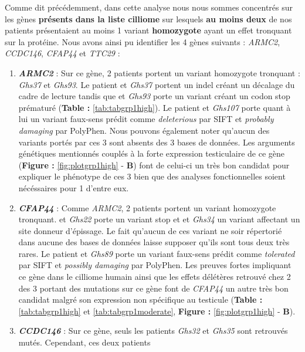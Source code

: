 \documentclass[12pt,twoside]{reedthesis}
\theoremstyle{definition}
\theoremstyle{definition}
\theoremstyle{remark}
\begin{document}
  Comme dit précédemment, dans cette analyse nous nous sommes concentrés
  sur les gènes \textbf{présents dans la liste cilliome} sur lesquels
  \textbf{au moins deux} de nos patients présentaient au moins 1 variant
  \textbf{homozygote} ayant un effet tronquant sur la protéine. Nous avons
  ainsi pu identifier les 4 gènes suivants : \emph{ARMC2}, \emph{CCDC146},
  \emph{CFAP44} et \emph{TTC29} :
  
  \begin{enumerate}
  \def\labelenumi{\arabic{enumi}.}
  \item
    \textbf{\emph{ARMC2}} : Sur ce gène, 2 patients portent un variant
    homozygote tronquant : \emph{Ghs37} et \emph{Ghs93}. Le patient et
    \emph{Ghs37} portent un indel créant un décalage du cadre de lecture
    tandis que et \emph{Ghs93} porte un variant créant un codon stop
    prématuré (\textbf{Table : }\ref{tab:tabgrp1high}). Le patient et
    \emph{Ghs107} porte quant à lui un variant faux-sens prédit comme
    \emph{deleterious} par SIFT et \emph{probably damaging} par PolyPhen.
    Nous pouvons également noter qu'aucun des variants portés par ces 3
    sont absents des 3 bases de données. Les arguments génétiques
    mentionnés couplés à la forte expression testiculaire de ce gène
    (\textbf{Figure : }\ref{fig:plotgrp1high} - \textbf{B}) font de
    celui-ci un très bon candidat pour expliquer le phénotype de ces 3
    bien que des analyses fonctionnelles soient nécéssaires pour 1 d'entre
    eux.
  \item
    \textbf{\emph{CFAP44}} : Comme \emph{ARMC2}, 2 patients portent un
    variant homozygote tronquant. et \emph{Ghs22} porte un variant stop et
    et \emph{Ghs34} un variant affectant un site donneur d'épissage. Le
    fait qu'aucun de ces variant ne soir répertorié dans aucune des bases
    de données laisse supposer qu'ils sont tous deux très rares. Le
    patient et \emph{Ghs89} porte un variant faux-sens prédit comme
    \emph{tolerated} par SIFT et \emph{possibly damaging} par PolyPhen.
    Les preuves fortes impliquant ce gène dans le cilliome humain ainsi
    que les effets délétères retrouvé chez 2 des 3 portant des mutations
    sur ce gène font de \emph{CFAP44} un autre très bon candidat malgré
    son expression non spécifique au testicule (\textbf{Table :
    }\ref{tab:tabgrp1high} et \ref{tab:tabgrp1moderate}, \textbf{Figure :
    }\ref{fig:plotgrp1high} - \textbf{B}).
  \item
    \textbf{\emph{CCDC146}} : Sur ce gène, seuls les patients \emph{Ghs32}
    et \emph{Ghs35} sont retrouvés mutés. Cependant, ces deux patients

\end{enumerate}
\end{document}
